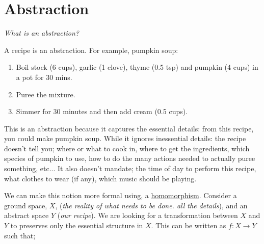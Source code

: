 \chapter{Abstraction}\label{C:abstraction}


\begin{displayquote}
 \textit{What is an abstraction?}
\end{displayquote}

A recipe is an abstraction. For example, pumpkin soup:

\begin{enumerate}
\tightlist
\item Boil stock (6 cups), garlic (1 clove), thyme (0.5 tsp) and pumpkin (4 cups) in a pot for 30 mins.
\item Puree the mixture.
\item Simmer for 30 minutes and then add cream (0.5 cups).
\end{enumerate}

This is an abstraction because it captures the essential details: from this recipe, you could make pumpkin soup.
While it ignores inessential details: the recipe doesn't tell you; where or what to cook in, where to get the
ingredients, which species of pumpkin to use, how to do the many actions needed to actually puree something, etc...
It also doesn't mandate; the time of day to perform this recipe, what clothes to wear (if any),
which music should be playing.


\vspace{5mm}

We can make this notion more formal using, a  \href{https://en.wikipedia.org/wiki/Homomorphism}{homomorphism}.
Consider a ground space, $X$, (\textit{the reality of what
needs to be done. all the details}), and an abstract space $Y$ (\textit{our recipe}).
We are looking for a transformation between $X$ and $Y$ to preserves only the essential
structure in $X$. This can be written as $f: X\to Y$ such that;


